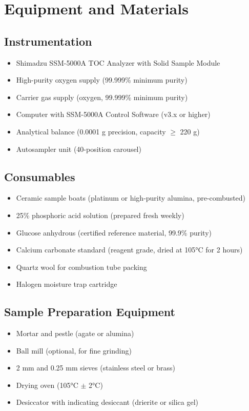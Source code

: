 \documentclass[11pt,a4paper]{article}\usepackage[]{graphicx}\usepackage[]{xcolor}
\begin{document}
\section{Equipment and Materials}

\subsection{Instrumentation}
\begin{itemize}[noitemsep]
    \item Shimadzu SSM-5000A TOC Analyzer with Solid Sample Module
    \item High-purity oxygen supply (99.999\% minimum purity)
    \item Carrier gas supply (oxygen, 99.999\% minimum purity)
    \item Computer with SSM-5000A Control Software (v3.x or higher)
    \item Analytical balance (0.0001 g precision, capacity $\geq$ 220 g)
    \item Autosampler unit (40-position carousel)
\end{itemize}

\subsection{Consumables}
\begin{itemize}[noitemsep]
    \item Ceramic sample boats (platinum or high-purity alumina, pre-combusted)
    \item 25\% phosphoric acid solution (prepared fresh weekly)
    \item Glucose anhydrous (certified reference material, 99.9\% purity)
    \item Calcium carbonate standard (reagent grade, dried at 105°C for 2 hours)
    \item Quartz wool for combustion tube packing
    \item Halogen moisture trap cartridge
\end{itemize}

\subsection{Sample Preparation Equipment}
\begin{itemize}[noitemsep]
    \item Mortar and pestle (agate or alumina)
    \item Ball mill (optional, for fine grinding)
    \item 2 mm and 0.25 mm sieves (stainless steel or brass)
    \item Drying oven (105°C $\pm$ 2°C)
    \item Desiccator with indicating desiccant (drierite or silica gel)
\end{itemize}
\end{document}
